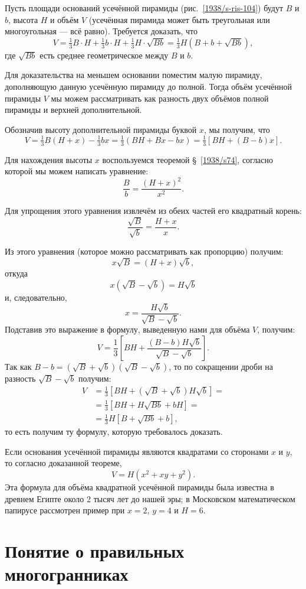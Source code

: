 Пусть площади оснований усечённой пирамиды (рис.~\ref{1938/s-ris-104}) будут $B$ и $b$, высота $H$ и объём $V$ (усечённая пирамида может быть треугольная или многоугольная — всё равно).
Требуется доказать, что
\[V = \tfrac13B\cdot H + \tfrac13 b \cdot H + \tfrac13 H\cdot \sqrt{Bb} = \tfrac13 H(B + b + \sqrt{Bb}),\]
где $\sqrt{Bb}$ есть среднее геометрическое между $B$ и $b$.

Для доказательства на меньшем основании поместим малую пирамиду, дополняющую данную усечённую пирамиду до полной.
Тогда объём усечённой пирамиды $V$ мы можем рассматривать как разность двух объёмов полной пирамиды и верхней дополнительной.

Обозначив высоту дополнительной пирамиды буквой $x$, мы получим, что
\[V = \tfrac13B(H + x)- \tfrac13bx = \tfrac13(BH + Bx-bx) = \tfrac13 [BH + (B - b)x].\]

Для нахождения высоты $x$ воспользуемся теоремой §~\ref{1938/s74}, согласно которой мы можем написать уравнение:
\[\frac Bb=\frac{(H+x)^2}{x^2}.\]

Для упрощения этого уравнения извлечём из обеих частей его квадратный корень:
\[\frac {\sqrt{B}}{\sqrt{b}}=\frac{H+x}{x}.\]

Из этого уравнения (которое можно рассматривать как пропорцию) получим:
\[x\sqrt{B}=(H+x)\sqrt{b},\]
откуда
\[x(\sqrt{B}-\sqrt{b})=H\sqrt{b}\]
и, следовательно,
\[x=\frac{H\sqrt{b}}{\sqrt{B}-\sqrt{b}}.\]
Подставив это выражение в формулу, выведенную нами для объёма $V$, получим:
\[V=\frac13\left[BH+\frac{(B-b)H\sqrt{b}}{\sqrt{B}-\sqrt{b}}\right].\]
Так как $B - b= (\sqrt{B} + \sqrt{b})(\sqrt{B} - \sqrt{b})$, то по сокращении дроби на разность $\sqrt{B} - \sqrt{b}$ получим:
\begin{align*}
V&=\frac13\left[BH+(\sqrt{B}+\sqrt{b})H\sqrt{b}\right]=
\\
&=\frac13\left[BH+H\sqrt{Bb}+bH\right]=
\\
&=\frac13 H\left[B+\sqrt{Bb}+b\right],
\end{align*}
то есть получим ту формулу, которую требовалось доказать.

\medskip

Если основания усечённой пирамиды являются квадратами со сторонами $x$ и $y$, то согласно доказанной теореме, 
\[V=H(x^2+xy+y^2).\]
Эта формула для объёма квадратной усечённой пирамиды была известна в древнем Египте около 2 тысяч лет до нашей эры; в Московском математическом папирусе рассмотрен пример при $x=2$, $y=4$ и $H=6$.

\section{Понятие о правильных многогранниках}

